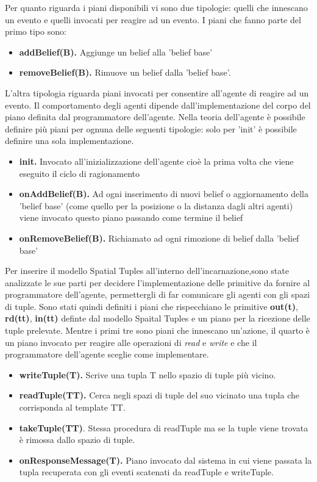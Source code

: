 \documentclass[12pt,a4paper,openright,twoside]{report}
\begin{document}
Per quanto riguarda i piani disponibili vi sono due tipologie: quelli che innescano un evento e quelli invocati per reagire ad un evento.
I piani che fanno parte del primo tipo sono:
\begin{itemize}
   \item \textbf{addBelief(B).} Aggiunge un belief alla 'belief base'
   \item \textbf{removeBelief(B).} Rimuove un belief dalla 'belief base'.
\end{itemize}
L'altra tipologia riguarda piani invocati per consentire all'agente di reagire ad un evento. Il comportamento degli agenti dipende dall'implementazione del corpo del piano definita dal programmatore dell'agente. Nella teoria dell'agente \`e possibile definire pi\`u piani per ognuna delle seguenti tipologie: solo per 'init' \`e possibile definire una sola implementazione.
\begin{itemize}
   \item \textbf{init.} Invocato all'inizializzazione dell'agente cio\`e la prima volta che viene eseguito il ciclo di ragionamento
   \item \textbf{onAddBelief(B).} Ad ogni inserimento di nuovi belief o aggiornamento della 'belief base' (come quello per la posizione o la distanza dagli altri agenti) viene invocato questo piano passando come termine il belief
   \item \textbf{onRemoveBelief(B).} Richiamato ad ogni rimozione di belief dalla 'belief base'
\end{itemize}

Per inserire il modello Spatial Tuples all'interno dell'incarnazione,sono state analizzate le sue parti per decidere l'implementazione delle primitive da fornire al programmatore dell'agente, permettergli di far comunicare gli agenti con gli spazi di tuple. Sono stati quindi definiti i piani che rispecchiano le primitive \textbf{out(t)}, \textbf{rd(tt)}, \textbf{in(tt)} definte dal modello Spaital Tuples e un piano per la ricezione delle tuple prelevate. Mentre i primi tre sono piani che innescano un'azione, il quarto \`e un piano invocato per reagire alle operazioni di \textit{read} e \textit{write} e che il programmatore dell'agente sceglie come implementare.

\begin{itemize}
   \item \textbf{writeTuple(T).} Scrive una tupla T nello spazio di tuple pi\`u vicino.
   \item \textbf{readTuple(TT).} Cerca negli spazi di tuple del suo vicinato una tupla che corrisponda al template TT.
   \item \textbf{takeTuple(TT)}. Stessa procedura di readTuple ma se la tuple viene trovata \`e rimossa dallo spazio di tuple.
   \item \textbf{onResponseMessage(T).} Piano invocato dal sistema in cui viene passata la tupla recuperata con gli eventi scatenati da readTuple e writeTuple.
\end{itemize}
\end{document}
